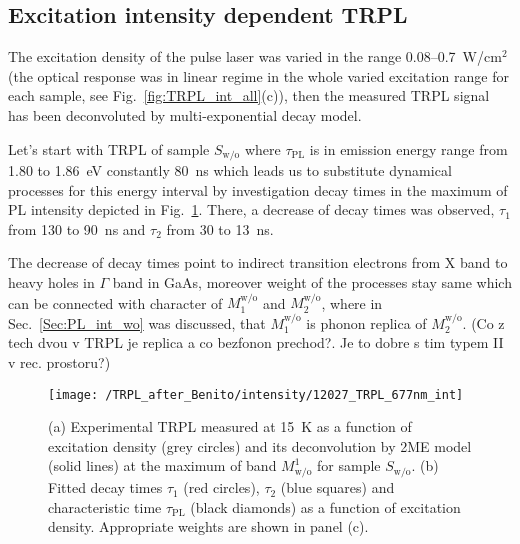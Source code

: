 \newpage
\subsection{Excitation intensity dependent TRPL}
The excitation density of the pulse laser was varied in the range 0.08--0.7~W/cm$^2$ (the optical response was in linear regime in the whole varied excitation range for each sample, see Fig.~\ref{fig:TRPL_int_all}(c)), then the measured TRPL signal has been deconvoluted by multi-exponential decay model. %

Let's start with TRPL of sample $S_\mathrm{w/o}$ where $\tau_\mathrm{PL}$ is in emission energy range from 1.80 to 1.86~eV constantly 80~ns which leads us to substitute dynamical processes for this energy interval by investigation decay times in the maximum of PL intensity depicted in Fig.~\ref{fig:TRPL_int_wo}. There, a decrease of decay times was observed, $\tau_1$ from 130 to 90~ns and $\tau_2$ from 30 to 13~ns.

The decrease of decay times point to indirect transition electrons from X band to heavy holes in $\Gamma$ band in GaAs, moreover weight of the processes stay same which can be connected with character of $M_1^\mathrm{w/o}$ and $M_2^\mathrm{w/o}$, where in Sec.~\ref{Sec:PL_int_wo} was discussed, that $M_1^\mathrm{w/o}$ is phonon replica of $M_2^\mathrm{w/o}$. {\color{red}(Co z tech dvou v TRPL je replica a co bezfonon prechod?. Je to dobre s tim typem II v rec. prostoru?)}


%

\begin{figure}
	\centering
	\texttt{[image: /TRPL\_after\_Benito/intensity/12027\_TRPL\_677nm\_int]}
	\caption{(a) Experimental TRPL measured at 15~K as a function of excitation density (grey circles) and its deconvolution by 2ME model (solid lines) at the maximum of band $M^1_\mathrm{w/o}$ for sample $S_\mathrm{w/o}$. (b) Fitted decay times $\tau_1$ (red circles), $\tau_2$ (blue squares) and characteristic time $\tau_\mathrm{PL}$ (black diamonds) as a function of excitation density. Appropriate weights are shown in panel (c).}
	\label{fig:TRPL_int_wo}
\end{figure}

